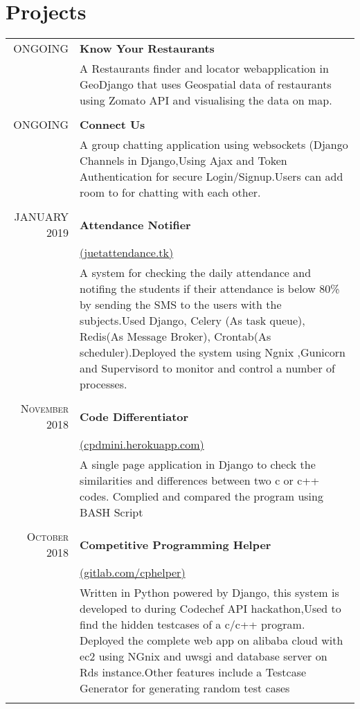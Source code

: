 \documentclass[a4paper,1pt]{article}
\begin{document}
\section{Projects}
\begin{tabular}{r|p{11cm}}
\textsc{ONGOING} & \textbf{Know Your Restaurants}\\&\footnotesize{A Restaurants finder and locator webapplication in GeoDjango that uses Geospatial data of restaurants using Zomato API and visualising the data on map.}\\\multicolumn{2}{c}{}\\
\textsc{ONGOING} & \textbf{Connect Us}\\&\footnotesize{A group chatting application using websockets (Django Channels in Django,Using Ajax and Token Authentication for secure Login/Signup.Users can add room to for chatting with each other.}\\\multicolumn{2}{c}{}\\
 \textsc{JANUARY 2019} & \textbf{Attendance Notifier}\\&\href{http://18.191.156.30:8000/api/v1/}{(juetattendance.tk)}\\&\footnotesize{A system for checking the daily attendance and notifing the students if their attendance
is below 80\% by sending the SMS to the users with the subjects.Used Django, Celery (As task queue), Redis(As Message Broker), Crontab(As scheduler).Deployed the system using Ngnix ,Gunicorn and Supervisord to monitor and control a number of processes.}\\\multicolumn{2}{c}{}\\

\textsc{November 2018} & \textbf{Code Differentiator}\\&\href{http://cpdmini.herokuapp.com/}{(cpdmini.herokuapp.com)}\\&\footnotesize{A single page application in Django to check the similarities and differences between two
c or c++ codes. Complied and compared the program using BASH Script}\\\multicolumn{2}{c}{} \\

\textsc{October 2018} & \textbf{Competitive Programming Helper}\\&\href{https://gitlab.com/gautamaggrawal/cphackathon}{(gitlab.com/cphelper)}\\&\footnotesize{Written in Python powered by Django, this system is developed to during Codechef API
hackathon,Used to find the hidden testcases of a c/c++ program. Deployed the complete web app on alibaba
cloud with ec2 using NGnix and uwsgi and database server on Rds instance.Other
features include a Testcase Generator for generating random test cases }\\\multicolumn{2}{c}{}\\


\end{tabular}\bigskip\par
\end{document}
